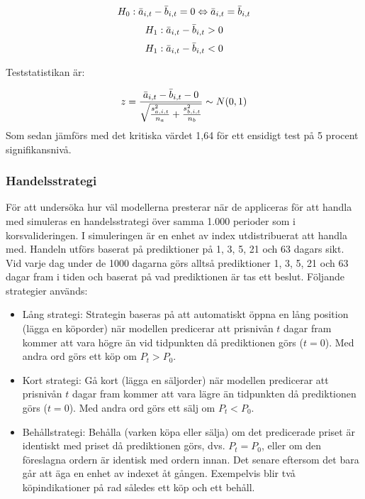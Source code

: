 \documentclass[11pt]{article}
\numberwithin{equation}{section}
\numberwithin{table}{section}
\numberwithin{figure}{section}
\begin{document}
\begin{equation}
    H_0: \Bar{a}_{i,t} - \Bar{b}_{i,t} = 0 \Leftrightarrow \Bar{a}_{i,t} = \Bar{b}_{i,t}
\end{equation}
\begin{equation}
    H_1: \Bar{a}_{i,t} - \Bar{b}_{i,t} > 0
\end{equation}
\begin{equation}
    H_1: \Bar{a}_{i,t} - \Bar{b}_{i,t} < 0
\end{equation}

Teststatistikan är: 

\begin{equation}
    z = \frac{\Bar{a}_{i,t} - \Bar{b}_{i,t} - 0}{\sqrt{\frac{s_{a,i,t}^2}{n_a}+\frac{s_{b,i,t}^2}{n_b}}} \sim N(0,1)
\end{equation}
Som sedan jämförs med det kritiska värdet 1,64 för ett ensidigt test på 5 procent signifikansnivå.


\subsubsection{Handelsstrategi}
För att undersöka hur väl modellerna presterar när de appliceras för att handla med simuleras en handelsstrategi över samma 1.000 perioder som i korsvalideringen. I simuleringen är en enhet av index utdistribuerat att handla med. Handeln utförs baserat på prediktioner på 1, 3, 5, 21 och 63 dagars sikt. Vid varje dag under de 1000 dagarna görs alltså prediktioner 1, 3, 5, 21 och 63 dagar fram i tiden och baserat på vad prediktionen är tas ett beslut. Följande strategier används:

\begin{itemize}
    \item Lång strategi: Strategin baseras på att automatiskt öppna en lång position (lägga en köporder) när modellen predicerar att prisnivån $t$ dagar fram kommer att vara högre än vid tidpunkten då prediktionen görs ($t=0$). Med andra ord görs ett köp om $P_t > P_0$.
    \item Kort strategi: Gå kort (lägga en säljorder) när modellen predicerar att prisnivån $t$ dagar fram kommer att vara lägre än tidpunkten då prediktionen görs ($t=0$). Med andra ord görs ett sälj om $P_t < P_0$.
    \item Behållstrategi: Behålla (varken köpa eller sälja) om det predicerade priset är identiskt med priset då prediktionen görs, dvs. $P_t = P_0$, eller om den föreslagna ordern är identisk med ordern innan. Det senare eftersom det bara går att äga en enhet av indexet åt gången. Exempelvis blir två köpindikationer på rad således ett köp och ett behåll.
\end{itemize}
\end{document}
